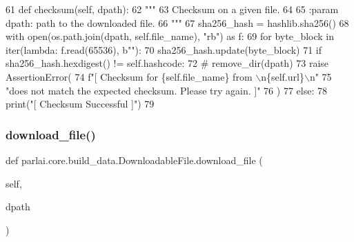 \begin{DoxyCode}
61     \textcolor{keyword}{def }checksum(self, dpath):
62         \textcolor{stringliteral}{"""}
63 \textcolor{stringliteral}{        Checksum on a given file.}
64 \textcolor{stringliteral}{}
65 \textcolor{stringliteral}{        :param dpath: path to the downloaded file.}
66 \textcolor{stringliteral}{        """}
67         sha256\_hash = hashlib.sha256()
68         with open(os.path.join(dpath, self.file\_name), \textcolor{stringliteral}{"rb"}) \textcolor{keyword}{as} f:
69             \textcolor{keywordflow}{for} byte\_block \textcolor{keywordflow}{in} iter(\textcolor{keyword}{lambda}: f.read(65536), b\textcolor{stringliteral}{""}):
70                 sha256\_hash.update(byte\_block)
71             \textcolor{keywordflow}{if} sha256\_hash.hexdigest() != self.hashcode:
72                 \textcolor{comment}{# remove\_dir(dpath)}
73                 \textcolor{keywordflow}{raise} AssertionError(
74                     f\textcolor{stringliteral}{"[ Checksum for \{self.file\_name\} from \(\backslash\)n\{self.url\}\(\backslash\)n"}
75                     \textcolor{stringliteral}{"does not match the expected checksum. Please try again. ]"}
76                 )
77             \textcolor{keywordflow}{else}:
78                 print(\textcolor{stringliteral}{"[ Checksum Successful ]"})
79 
\end{DoxyCode}
\mbox{\label{classparlai_1_1core_1_1build__data_1_1DownloadableFile_a2d7ae322b78f070c78050cbb41636bd4}} 
\subsubsection{\texorpdfstring{download\+\_\+file()}{download\_file()}}
{\footnotesize\ttfamily def parlai.\+core.\+build\+\_\+data.\+Downloadable\+File.\+download\+\_\+file (\begin{DoxyParamCaption}\item[{}]{self,  }\item[{}]{dpath }\end{DoxyParamCaption})}



